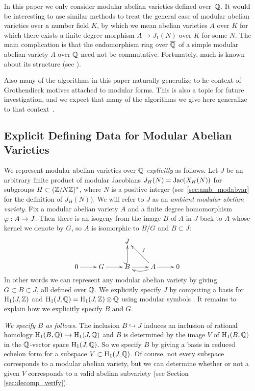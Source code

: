 \documentclass{article}
\begin{document}
\begin{remark}
    In this paper we only consider modular abelian varieties defined
    over~$\mathbb{Q}$.  It would be interesting to use similar methods to treat
    the general case of modular abelian varieties over a number field
    $K$, by which we mean abelian varieties $A$ over $K$ for which there
    exists a finite degree morphism $A\to J_1(N)$ over $K$ for some
    $N$. The main complication is that the endomorphism ring over
    $\overline{\mathbb{Q}}$ of a simple modular abelian variety $A$ over $\mathbb{Q}$ need not
    be commutative.  Fortunately, much is known about its structure (see
    \cite{ribet:twists}).

    Also many of the algorithms in this paper naturally generalize to
    he context of Grothendieck motives attached to modular forms.  This
    is also a topic for future investigation, and we expect that many of the
    algorithms we give here generalize to that
    context~\cite{dummigan-stein-watkins:motives}.
\end{remark}



\subsection{Explicit Defining Data for Modular Abelian Varieties}
We represent modular abelian varieties over $\mathbb{Q}$ {\em explicitly} as
follows. Let $J$ be an arbitrary finite product of modular Jacobians
$J_H(N)=\operatorname{Jac}(X_H(N))$ for subgroups $H\subset (\mathbb{Z}/N\mathbb{Z})^*$, where
$N$ is a positive integer (see~\ref{sec:amb_modabvar} for the definition
of $J_H(N)$).  We will refer to $J$ as an \emph{ambient modular abelian
variety}.
Fix a modular abelian variety $A$ and a
finite degree homomorphism $\varphi: A\to J$.  Then there is an isogeny
from the image $B$ of $A$ in $J$ back to $A$ whose kernel we denote by
$G$, so $A$ is isomorphic to $B/G$ and $B\subset J$:
$$
\xymatrix{
    & & J & & \\
    0\ar[r]& G \ar[r]& B\ar@{^(->}[u] \ar[r]& A\ar[r] \ar@/^/[l]\ar[ul]_{f} & 0
}
$$
In other words we can represent any modular abelian variety by giving $G\subset
B\subset J$, all defined over $\mathbb{Q}$. We explicitly specify $J$ by computing a
basis for $\operatorname{H}_1(J,\mathbb{Z})$ and $\operatorname{H}_1(J,\mathbb{Q})=\operatorname{H}_1(J,\mathbb{Z})\otimes \mathbb{Q}$ using modular
symbols \cite{stein:modular_forms:2007}. It remains to explain how we explicitly specify
$B$ and $G$.

{\em We specify $B$ as follows.}  The inclusion $B \hookrightarrow J$
induces an inclusion of rational homology $\operatorname{H}_1(B, \mathbb{Q}) \hookrightarrow
\operatorname{H}_1(J, \mathbb{Q})$ and $B$ is determined by the image $V$ of $\operatorname{H}_1(B,\mathbb{Q})$ in
the $\mathbb{Q}$-vector space $\operatorname{H}_1(J,\mathbb{Q})$.  So we specify $B$ by giving a basis in
reduced echelon form for a subspace $V \subset \operatorname{H}_1(J, \mathbb{Q})$. Of
course, not every subspace corresponds to a modular abelian variety,
but we can determine whether or not a given $V$ corresponds to a valid
abelian subvariety (see Section \ref{sec:decomp_verify}).
\end{document}
